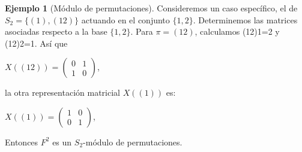 \documentclass[12pt]{book}
\theoremstyle{definition}
\newtheorem{example}[theorem]{Ejemplo}
\newcounter{in}
\begin{document}
\begin{example}[Módulo de permutaciones]
  Consideremos un caso específico, el de $S_{2}=\{(1),(12)\}$ actuando
  en el conjunto $\{1,2\}$. Determinemos las
  matrices asociadas respecto a la base $\{1,2\}$. Para
  $\pi=(12)$, calculamos (12)1=2 y (12)2=1. Así que
  \begin{center}
    $X((12))=\begin{pmatrix}
      0 & 1  \\
      1 & 0  
    \end{pmatrix}$,
  \end{center}
  la otra representación matricial $X((1))$ es:
  \begin{center}
    $X((1))=\begin{pmatrix}
      1 & 0  \\
      0 & 1  
    \end{pmatrix}$,
  \end{center}
Entonces $F^{2}$ es un $S_{2}$-módulo de permutaciones.

  

\end{example}
\end{document}
